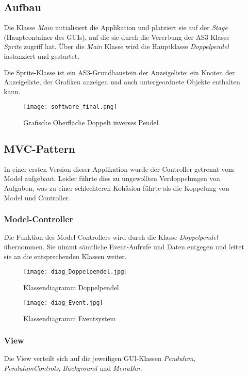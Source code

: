 \documentclass[12pt]{article}
\numberwithin{equation}{subsection}
\begin{document}
\subsection{Aufbau}
Die Klasse \textit{Main} initialisiert die Applikation und platziert sie auf der \textit{Stage} (Hauptcontainer des GUIs), auf die sie durch die Vererbung der AS3 Klasse \textit{Sprite} zugriff hat. Über die \textit{Main} Klasse wird die Hauptklasse \textit{Doppelpendel} instanziert und gestartet. 

Die Sprite-Klasse ist ein AS3-Grundbaustein der Anzeigeliste: ein Knoten der Anzeigeliste, der Grafiken anzeigen und auch untergeordnete Objekte enthalten kann.

\begin{figure}[H]
	\centering
	\texttt{[image: software\_final.png]}
	\caption{Grafische Oberfläche Doppelt inverses Pendel}
	\label{fig:gui:final}
\end{figure}

\subsection{MVC-Pattern}
In einer ersten Version dieser Applikation wurde der Controller getrennt vom Model aufgebaut. Leider führte dies zu ungewollten Verdoppelungen von Aufgaben, was zu einer schlechteren Kohäsion führte als die Koppelung von Model und Controller.

\subsubsection{Model-Controller}
Die Funktion des Model-Controllers wird durch die Klasse \textit{Doppelpendel} übernommen. Sie nimmt sämtliche Event-Aufrufe und Daten entgegen und leitet sie an die entsprechenden Klassen weiter.

\begin{figure}[H]
	\centering
	\texttt{[image: diag\_Doppelpendel.jpg]}
	\caption{Klassendiagramm Doppelpendel}
	\label{fig:diag:doppelpendel}
\end{figure}

\begin{figure}[H]
	\centering
	\texttt{[image: diag\_Event.jpg]}
	\caption{Klassendiagramm Eventsystem}
	\label{fig:diag:event}
\end{figure}

\subsubsection{View}
Die View verteilt sich auf die jeweiligen GUI-Klassen \textit{Pendulum}, \textit{PendulumControls}, \textit{Background} und \textit{MenuBar}.
\end{document}

